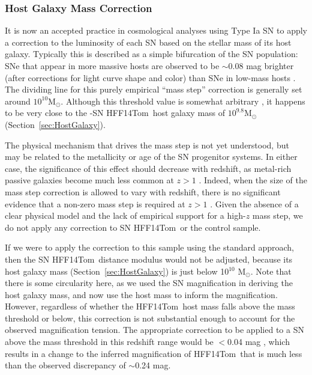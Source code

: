 \documentclass[iop]{emulateapj}
\def\tomas{HFF14Tom}
\def\Msun{\mbox{M$_{\odot}$}}
\begin{document}
\subsubsection{Host Galaxy Mass Correction}
\label{sec:HostGalaxyMassCorrection}

It is now an accepted practice in cosmological analyses using Type Ia
SN to apply a correction to the luminosity of each SN based on the
stellar mass of its host galaxy. Typically this is described as a
simple bifurcation of the SN population: SNe that appear in more
massive hosts are observed to be $\sim$0.08 mag brighter (after
corrections for light curve shape and color) than SNe in low-mass
hosts \citep{Kelly:2010,Sullivan:2010}.  The dividing line for this
purely empirical ``mass step'' correction is generally set around
$10^{10}$\Msun.  Although this threshold value is somewhat arbitrary \citep[see
e.g.][]{Betoule:2014}, it happens to be very close to the
-SN \tomas\ host galaxy mass of $10^{9.8}$\Msun (Section~\ref{sec:HostGalaxy}).

The physical mechanism that drives the mass step is not yet
understood, but may be related to the metallicity or age of the SN
progenitor systems.  In either case, the significance of this effect
should decrease with redshift, as metal-rich passive galaxies become
much less common at $z>1$ \citep[see
e.g.][]{Rigault:2013,Childress:2014b}.  Indeed, when the size of the
mass step correction is allowed to vary with redshift, there is no
significant evidence that a non-zero mass step is required at
$z>1$ \citep{Suzuki:2012,Shafer:2014,Betoule:2014}.  Given the
absence of a clear physical model and the lack of empirical support
for a high-$z$ mass step, we do not apply any correction to SN \tomas\
or the control sample. 

If we were to apply the correction to this sample using the standard
approach, then the SN \tomas\ distance modulus would not be adjusted,
because its host galaxy mass (Section~\ref{sec:HostGalaxy}) is just
below 10$^{10}$ \Msun. Note that there is some circularity here, as we
used the SN magnification in deriving the host galaxy mass, and now
use the host mass to inform the magnification.  However, regardless of
whether the \tomas\ host mass falls above the mass threshold or below,
this correction is not substantial enough to account for the observed
magnification tension.  The appropriate correction to be applied to
a SN above the mass threshold in this redshift range would be $<$0.04
mag \citep{Rigault:2013,Childress:2014b}, which results in a change to
the inferred magnification of \tomas\ that is much less than the
observed discrepancy of $\sim$0.24 mag.
\end{document}
